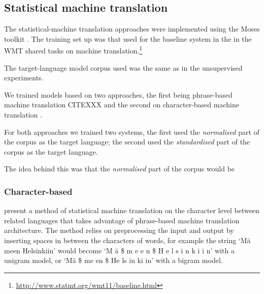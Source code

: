 \documentclass[11pt]{article}
\begin{document}
%

\subsection{Statistical machine translation}


The statistical-machine translation approaches were implemented using the 
Moses toolkit \cite{koehn2007}. The training set up was that used for
the baseline system in the  in the WMT shared tasks
on machine translation.\footnote{\url{http://www.statmt.org/wmt11/baseline.html}}

The target-language model corpus used was the same as in the unsupervised experiments. 

We trained models based on two approaches, the first being phrase-based machine translation
CITEXXX and the second on character-based machine translation \cite{nakov2012,TiedemannEAMT2009}.

For both approaches we trained two systems, the first used the \emph{normalised}
part of the corpus as the target language; the second used the \emph{standardised} 
part of the corpus as the target language.

The idea behind this was that the \emph{normalised} part of the corpus would be 

\subsubsection{Character-based}

 present a method of statistical machine translation on the character level between related languages that takes advantage of phrase-based machine translation architecture. The method relies on preprocessing the input and output by inserting spaces in between the characters of words, for example the string `M\"{a} meen Helsinkiin' would become `M \"{a} \$ m e e n \$ H e l s i n k i i n' with a unigram model, or `M\"{a} \$ me en \$ He ls in ki in' with a bigram model.
\end{document}
